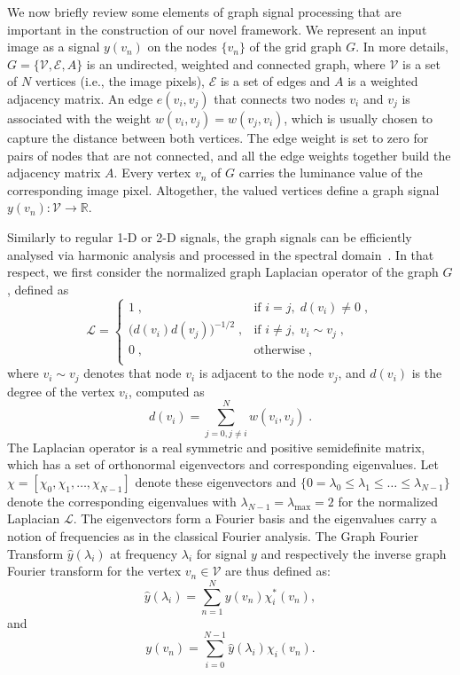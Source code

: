 \documentclass[10pt,journal,compsoc]{IEEEtran}
\begin{document}
	We now briefly review some elements of graph signal processing that are important in the construction of our novel framework. We represent an input image as a signal $y(v_n)$ on the nodes $\{v_n\}$ of the grid graph $G$. In more details, $G=\{{\mathcal{V},\mathcal{E}}, A\}$ is an undirected, weighted and connected graph, where $\mathcal{V}$ is a set of $N$ vertices (i.e., the image pixels), $\mathcal{E}$ is a set of edges and $A$ is a weighted adjacency matrix. An edge $e(v_i,v_j)$ that connects two nodes $v_i$ and $v_j$ is associated with the weight $w(v_i, v_j)=w(v_j, v_i)$, which is usually chosen to capture the distance between both vertices. The edge weight is set to zero for pairs of nodes that are not connected, and all the edge weights together build the adjacency matrix $A$. Every vertex $v_n$ of $G$ carries the luminance value of the corresponding image pixel. Altogether, the valued vertices define a graph signal $y(v_n): \mathcal{V} \to \mathbb{R}$.

	Similarly to regular 1-D or 2-D signals, the graph signals can be efficiently analysed via harmonic analysis and processed in the spectral domain~\cite{bb:shuman2013emerging}. In that respect, we first consider the normalized graph Laplacian operator of the graph $G$, defined as
			\begin{equation}
	\mathcal{L} =
	\begin{cases}
	1\;,  & \mbox{if } i = j, \; d(v_i) \neq 0 \;, \\
	\big(d(v_i) d(v_j)\big)^{-1/2}\;, &  \mbox{if } i \neq j, \; v_i \sim v_j \;, \\
	0\;, &  \mbox{otherwise}\;, \\
	\end{cases}
	\label{eq:laplacian}
	\end{equation}
	\noindent
	where $v_i \sim v_j$ denotes that node $v_i$ is adjacent to the node $v_j$, and $d(v_i)$ is the degree of the vertex $v_i$, computed as
	\begin{equation}
	d(v_i) = \sum_{j=0, j \neq i}^N w(v_i, v_j)\;.
	\end{equation}
	The Laplacian operator is a real symmetric and positive semidefinite matrix, which has a set of orthonormal eigenvectors and corresponding eigenvalues. Let $\chi=[\chi_0, \chi_1, \dots, \chi_{N-1}]$ denote these eigenvectors and $\{0=\lambda_0 \leq \lambda_1\leq \dots \leq \lambda_{N-1} \}$ denote the corresponding eigenvalues with $\lambda_{N-1} = \lambda_{\mathrm{max}} = 2$ for the normalized Laplacian $\mathcal{L}$. The eigenvectors form a Fourier basis and the eigenvalues carry a notion of frequencies as in the classical Fourier analysis. The Graph Fourier Transform $\hat{y}(\lambda_i)$ at frequency $\lambda_i$ for signal $y$ and respectively the inverse graph Fourier transform for the vertex $v_n \in \mathcal{V}$ are thus defined as:
	\begin{equation}
	\hat{y}(\lambda_i) = \sum_{n=1}^{N} y(v_n) \chi_i^*(v_n),
	\end{equation}
	and
	\begin{equation}
	y(v_n) = \sum_{i=0}^{N-1} \hat{y}(\lambda_i) \chi_i(v_n).
	\end{equation}
	\noindent
\end{document}
